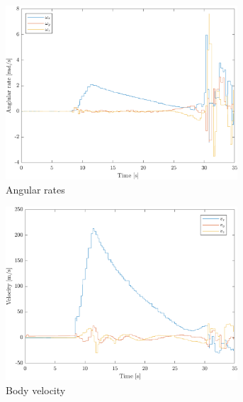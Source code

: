 \begin{figure}[ht]
\begin{subfigure}{0.45\textwidth}
        \includegraphics[width=0.95\textwidth]{images-results/testflight_w.png}
        \caption{Angular rates}
        \label{fig:testflight-w}
    \end{subfigure}
    \begin{subfigure}{0.45\textwidth}
        \includegraphics[width=0.95\textwidth]{images-results/testflight_v.png}
        \caption{Body velocity}
        \label{fig:testflight-v}
    \end{subfigure}
    \begin{subfigure}{0.45\textwidth}

\end{subfigure}
\end{figure}
